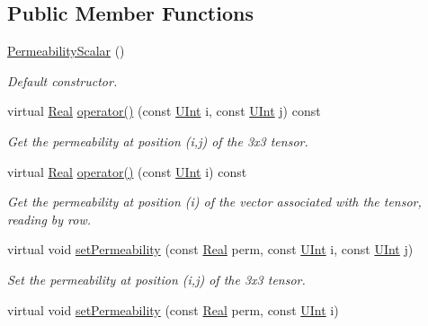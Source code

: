 \subsection*{Public Member Functions}
\begin{DoxyCompactItemize}
\item 
\hyperlink{classFVCode3D_1_1PermeabilityScalar_a0881201e2a0149dbe3b81c527e979cbc}{Permeability\+Scalar} ()
\begin{DoxyCompactList}\small\item\em Default constructor. \end{DoxyCompactList}\item 
virtual \hyperlink{namespaceFVCode3D_a40c1f5588a248569d80aa5f867080e83}{Real} \hyperlink{classFVCode3D_1_1PermeabilityScalar_aba4750f0a15a68057a0d7ef0f1cf5b2e}{operator()} (const \hyperlink{namespaceFVCode3D_a4bf7e328c75d0fd504050d040ebe9eda}{U\+Int} i, const \hyperlink{namespaceFVCode3D_a4bf7e328c75d0fd504050d040ebe9eda}{U\+Int} j) const 
\begin{DoxyCompactList}\small\item\em Get the permeability at position (i,j) of the 3x3 tensor. \end{DoxyCompactList}\item 
virtual \hyperlink{namespaceFVCode3D_a40c1f5588a248569d80aa5f867080e83}{Real} \hyperlink{classFVCode3D_1_1PermeabilityScalar_a04c9403d35845b8589c9ee6eac5b3452}{operator()} (const \hyperlink{namespaceFVCode3D_a4bf7e328c75d0fd504050d040ebe9eda}{U\+Int} i) const 
\begin{DoxyCompactList}\small\item\em Get the permeability at position (i) of the vector associated with the tensor, reading by row. \end{DoxyCompactList}\item 
virtual void \hyperlink{classFVCode3D_1_1PermeabilityScalar_a41b228192c099a80f5d01b5bdc73e48d}{set\+Permeability} (const \hyperlink{namespaceFVCode3D_a40c1f5588a248569d80aa5f867080e83}{Real} perm, const \hyperlink{namespaceFVCode3D_a4bf7e328c75d0fd504050d040ebe9eda}{U\+Int} i, const \hyperlink{namespaceFVCode3D_a4bf7e328c75d0fd504050d040ebe9eda}{U\+Int} j)
\begin{DoxyCompactList}\small\item\em Set the permeability at position (i,j) of the 3x3 tensor. \end{DoxyCompactList}\item 
virtual void \hyperlink{classFVCode3D_1_1PermeabilityScalar_abd56a7a6313deb1399c1f323f415862f}{set\+Permeability} (const \hyperlink{namespaceFVCode3D_a40c1f5588a248569d80aa5f867080e83}{Real} perm, const \hyperlink{namespaceFVCode3D_a4bf7e328c75d0fd504050d040ebe9eda}{U\+Int} i)

\end{DoxyCompactItemize}
